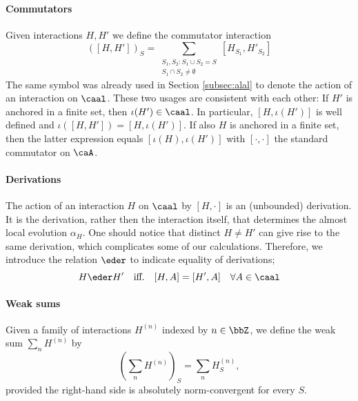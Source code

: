 \paragraph{Commutators} Given interactions $H,H'$ we define the commutator interaction
$$
([H,H'])_S= \sum_{\substack{ S_1,S_2:  S_1\cup S_2=S \\  S_1 \cap S_2 \neq\emptyset} }   [H_{S_1},H'_{S_2}]
$$
The same symbol was already used in Section \ref{subsec:alal}  to denote the action of an interaction on $\caal$. These two usages are consistent with each other:  If $H'$ is anchored in a finite set, then $\iota(H')\in\caal$. In particular, $[H,\iota(H')]$ is well defined and $\iota([H,H'])=[H,\iota(H')]$. If also $H$ is anchored in a finite set, then the latter expression equals  $[\iota(H),\iota(H')]$ with $[\cdot,\cdot]$ the standard commutator on $\caA$. 



\paragraph{Derivations}\label{sec: derivations}
The action of an interaction $H$ on $\caal$ by $[H,\cdot]$ is an (unbounded) derivation. It is the derivation, rather then the interaction itself, that determines the almost local evolution $\alpha_H$. 
One should notice that distinct $H\neq H'$ can give rise to the same derivation, which complicates some of our calculations. Therefore, we introduce the relation $\eder$ to indicate equality of derivations;
$$
H \eder H' \quad \text{iff.} \quad   [H,A]=[H',A] \quad \forall A \in\caal
$$




\paragraph{Weak sums} 
Given a family of interactions $H^{(n)}$ indexed by $n\in \bbZ$, we define the weak sum $\sum_n H^{(n)}$ by
$$
(\sum_n H^{(n)})_S=  \sum_n H^{(n)}_S, 
$$ 
provided the right-hand side is absolutely norm-convergent for every $S$. 
